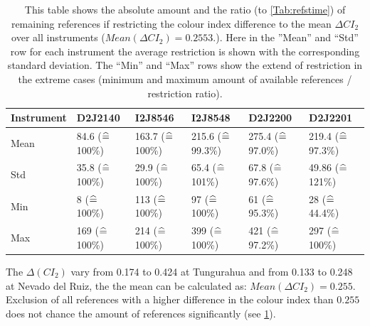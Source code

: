 \begin{table}[h]
	\centering
	\begin{tabular}{|p{1.8cm}|p{2.15cm}|p{2.15cm}|p{2.15cm}|p{2.15cm}|p{2.15cm}|}
		Instrument	&D2J2140&I2J8546& I2J8548&D2J2200&D2J2201\\
		\toprule
		Mean&
		84.6 ($\mathrel{\widehat{=}}\,$100\%) &	163.7 ($\mathrel{\widehat{=}}\,$100\%)&	215.6 ($\mathrel{\widehat{=}}\,$99.3\%)&
		275.4 ($\mathrel{\widehat{=}}\,$97.0\%) &219.4 ($\mathrel{\widehat{=}}\,$97.3\%) \\
		\midrule
		Std&
		35.8 ($\mathrel{\widehat{=}}\,$100\%) &	29.9 ($\mathrel{\widehat{=}}\,$100\%) &
		65.4 ($\mathrel{\widehat{=}}\,$101\%)&
		67.8 ($\mathrel{\widehat{=}}\,$97.6\%) &
		49.86 ($\mathrel{\widehat{=}}\,$121\%) \\
		\midrule
		Min&
		8 ($\mathrel{\widehat{=}}\,$100\%) &
		113 ($\mathrel{\widehat{=}}\,$100\%) 
		&97 ($\mathrel{\widehat{=}}\,$100\%) 
		&61 ($\mathrel{\widehat{=}}\,$95.3\%) 
		&28	 ($\mathrel{\widehat{=}}\,$44.4\%) \\
		\midrule
		Max
		&169 ($\mathrel{\widehat{=}}\,$100\%) 
		&214 ($\mathrel{\widehat{=}}\,$100\%) 
		&399 ($\mathrel{\widehat{=}}\,$100\%) 
		&421 ($\mathrel{\widehat{=}}\,$97.2\%) 
		&297 ($\mathrel{\widehat{=}}\,$100\%)  \\
		\bottomrule
	\end{tabular}
	\caption{This table shows the absolute amount and the ratio  (to \cref{Tab:refstime}) of remaining references if restricting the colour index difference to the mean $\Delta CI_{2}$ over all instruments ($Mean(\Delta CI_{2}) = 0.2553.$). Here in the ”Mean” and “Std” row for each  instrument the average restriction is shown with the corresponding standard deviation. The “Min” and “Max” rows show the extend of restriction in the extreme cases (minimum and maximum amount of available references / restriction ratio).}
	\label{tab:colidxres}
\end{table}	
The $\Delta( CI_{2})$ vary from 0.174 to 0.424 at Tungurahua and from 0.133 to 0.248 at Nevado del Ruiz, the
the mean can be calculated as: $Mean(\Delta CI_{2}) = 0.255$. Exclusion of all references with a higher difference in the colour index than $ 0.255$ does not chance the amount of references significantly (see \cref{tab:colidxres}).\\


